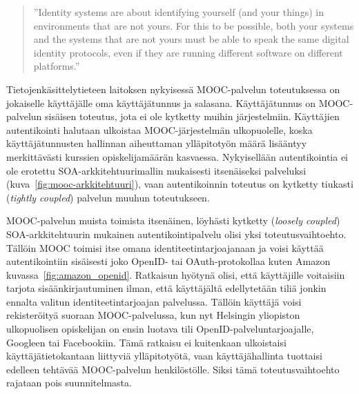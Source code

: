 \documentclass[finnish,gradu]{tktltiki}
\begin{document}
  \begin{quote}
    ''Identity systems are about identifying yourself (and your things) in environments that are not yours.
    For this to be possible, both your systems and the systems that are not yours
    must be able to speak the same digital identity protocols,
    even if they are running different software on different platforms.''~\cite{cameron_id_arch_2006}
  \end{quote}

  Tietojenkäsittelytieteen laitoksen nykyisessä MOOC-palvelun toteutuksessa on jokaiselle käyttäjälle oma käyttäjätunnus ja salasana. Käyttäjätunnus on MOOC-palvelun sisäisen toteutus, jota ei ole kytketty muihin järjestelmiin. Käyttäjien autentikointi halutaan ulkoistaa MOOC-järjestelmän ulkopuolelle, koska käyttäjätunnusten hallinnan aiheuttaman ylläpitotyön määrä lisääntyy merkittävästi kurssien opiskelijamäärän kasvaessa. Nykyisellään autentikointia ei ole erotettu SOA-arkkitehtuurimallin mukaisesti itsenäiseksi palveluksi (kuva~\ref{fig:mooc-arkkitehtuuri}), vaan autentikoinnin toteutus on kytketty tiukasti (\emph{tightly coupled}) palvelun muuhun toteutukseen.

  MOOC-palvelun muista toimista itsenäinen, löyhästi kytketty (\emph{loosely coupled}) SOA-arkkitehtuurin mukainen autentikointipalvelu olisi yksi toteutusvaihtoehto. Tällöin MOOC toimisi itse omana identiteetintarjoajanaan ja voisi käyttää autentikointiin sisäisesti joko OpenID- tai OAuth-protokollaa kuten Amazon kuvassa~\ref{fig:amazon_openid}. Ratkaisun hyötynä olisi, että käyttäjille voitaisiin tarjota sisäänkirjautuminen ilman, että käyttäjältä edellytetään tiliä jonkin ennalta valitun identiteetintarjoajan palvelussa. Tällöin käyttäjä voisi rekisteröityä suoraan MOOC-palvelussa, kun nyt Helsingin yliopiston ulkopuolisen opiskelijan on ensin luotava tili OpenID-palveluntarjoajalle, Googleen tai Facebookiin. Tämä ratkaisu ei kuitenkaan ulkoistaisi käyttäjätietokantaan liittyviä ylläpitotyötä, vaan käyttäjähallinta tuottaisi edelleen tehtävää MOOC-palvelun henkilöstölle. Siksi tämä toteutusvaihtoehto rajataan pois suunnitelmasta.
\end{document}
